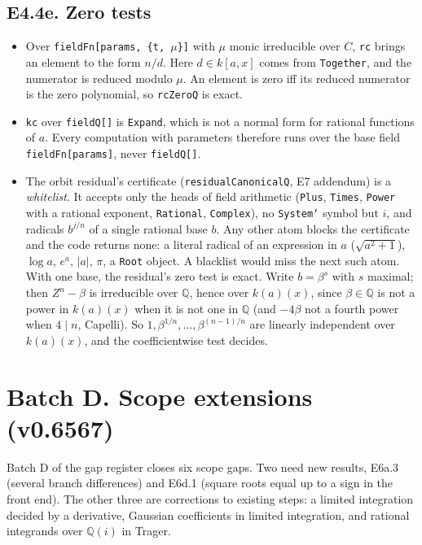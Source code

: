 \documentclass[11pt]{article}
\theoremstyle{definition}
\theoremstyle{remark}
\newcommand{\Q}{\mathbb{Q}}
\newcommand{\code}[1]{\texttt{#1}}
\begin{document}
\subsection*{E4.4e. Zero tests}
\begin{itemize}
\item Over \code{fieldFn[params, \{t, $\mu$\}]} with $\mu$ monic irreducible over $C$,
  \code{rc} brings an element to the form $n/d$. Here $d\in k[a,x]$ comes from
  \code{Together}, and the numerator is reduced modulo $\mu$. An element is zero iff
  its reduced numerator is the zero polynomial, so \code{rcZeroQ} is exact.
\item \code{kc} over \code{fieldQ[]} is \code{Expand}, which is not a normal form for
  rational functions of $a$. Every computation with parameters therefore runs over the
  base field \code{fieldFn[params]}, never \code{fieldQ[]}.
\item The orbit residual's certificate (\code{residualCanonicalQ}, E7 addendum) is a
  \emph{whitelist}. It accepts only the heads of field arithmetic (\code{Plus},
  \code{Times}, \code{Power} with a rational exponent, \code{Rational}, \code{Complex}),
  no \code{System`} symbol but $i$, and radicals $b^{j/n}$ of a single rational base
  $b$. Any other atom blocks the certificate and the code returns none: a literal radical
  of an expression in $a$ ($\sqrt{a^2+1}$), $\log a$, $e^a$, $|a|$, $\pi$, a
  \code{Root} object. A blacklist would miss the next such atom. With one base, the
  residual's zero test is exact. Write $b=\beta^{s}$ with $s$ maximal; then
  $Z^n-\beta$ is irreducible over $\Q$, hence over $k(a)(x)$, since $\beta\in\Q$ is not
  a power in $k(a)(x)$ when it is not one in $\Q$ (and $-4\beta$ not a fourth power when
  $4\mid n$, Capelli). So $1,\beta^{1/n},\dots,\beta^{(n-1)/n}$ are linearly
  independent over $k(a)(x)$, and the coefficientwise test decides.
\end{itemize}

\section*{Batch D. Scope extensions (v0.6567)}

Batch D of the gap register closes six scope gaps. Two need new results,
E6a.3 (several branch differences) and E6d.1 (square roots equal up to a sign
in the front end). The other three are corrections to existing steps: a limited
integration decided by a derivative, Gaussian coefficients in limited
integration, and rational integrands over $\Q(i)$ in Trager.
\end{document}
